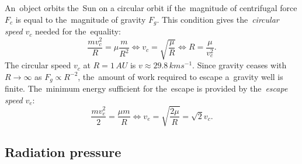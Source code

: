 An~object orbits the~Sun on a circular orbit if the~magnitude of centrifugal force $F_c$ is equal to the~magnitude of gravity $F_g$. This condition gives the~\textit{circular speed} $v_c$ needed for the~equality: 
\begin{equation}
    \frac{m v_c^2}{R} = \mu \frac{m}{R^2} \Leftrightarrow v_c = \sqrt{\frac{\mu}{R}} \Leftrightarrow R = \frac{\mu}{v_c^2}.
    \label{eq:circular_speed}
\end{equation}
The circular speed $v_c$ at $R = 1 \, \si{AU}$ is $v \approx 29.8 \, \si{km s^{-1}}$. Since gravity ceases with $R \to \infty$ as $F_g \propto R^{-2}$, the~amount of work required to escape a~gravity well is finite. The~minimum energy sufficient for the~escape is provided by the~\textit{escape speed} $v_e$: 
\begin{equation}
    \frac{m v_e^2}{2} = \frac{\mu m}{R} \Leftrightarrow v_e = \sqrt{\frac{2 \mu}{R}} = \sqrt{2} v_c.
    \label{eq:escape_speed}
\end{equation}

\subsection{Radiation pressure}

